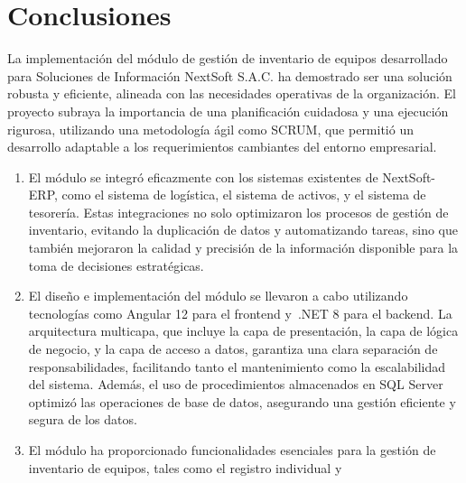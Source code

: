 \documentclass[stu, 12pt, letterpaper, donotrepeattitle, floatsintext, natbib]{apa7}
\begin{document}
\section{Conclusiones}
La implementación del módulo de gestión de inventario de equipos desarrollado para Soluciones de Información NextSoft S.A.C. ha demostrado ser
una solución robusta y eficiente, alineada con las necesidades operativas de la organización. El proyecto subraya la importancia de una
planificación cuidadosa y una ejecución rigurosa, utilizando una metodología ágil como SCRUM, que permitió un desarrollo adaptable a los
requerimientos cambiantes del entorno empresarial.
\begin{enumerate}
    \item %
          El módulo se integró eficazmente con los sistemas existentes de NextSoft-ERP, como el sistema de logística, el sistema de activos, y
          el sistema de tesorería. Estas integraciones no solo optimizaron los procesos de gestión de inventario, evitando la duplicación de
          datos y automatizando tareas, sino que también mejoraron la calidad y precisión de la información disponible para la toma de
          decisiones estratégicas.
    \item %
          El diseño e implementación del módulo se llevaron a cabo utilizando tecnologías como Angular 12 para el frontend y~.NET 8 para el
          backend. La arquitectura multicapa, que incluye la capa de presentación, la capa de lógica de negocio, y la capa de acceso a datos,
          garantiza una clara separación de responsabilidades, facilitando tanto el mantenimiento como la escalabilidad del sistema. Además,
          el uso de procedimientos almacenados en SQL Server optimizó las operaciones de base de datos, asegurando una gestión eficiente y
          segura de los datos.
    \item %
          El módulo ha proporcionado funcionalidades esenciales para la gestión de inventario de equipos, tales como el registro individual y

\end{enumerate}
\end{document}

